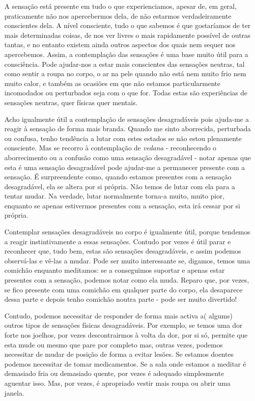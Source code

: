 A sensação está presente em tudo o que experienciamos, apesar de, em
geral, praticamente não nos apercebermos dela, de não estarmos
verdadeiramente conscientes dela. A nível consciente, tudo o que sabemos
é que gostaríamos de ter mais determinadas coisas, de nos ver livres o
mais rapidamente possível de outras tantas, e no entanto existem ainda
outros aspectos dos quais nem sequer nos apercebemos. Assim, a
contemplação das sensações é uma base muito útil para a consciência.
Pode ajudar-nos a estar mais conscientes das sensações neutras, tal como
sentir a roupa no corpo, o ar na pele quando não está nem muito frio nem
muito calor, e também as ocasiões em que não estamos particularmente
incomodados ou perturbados seja com o que for. Todas estas são
experiências de sensações neutras, quer físicas quer mentais.

Acho igualmente útil a contemplação de sensações desagradáveis pois
ajuda-me a reagir à sensação de forma mais branda. Quando me sinto
aborrecida, perturbada ou confusa, tenho tendência a lutar com estes
estados se não estou plenamente consciente. Mas se recorro à
contemplação de \emph{vedana} - reconhecendo o aborrecimento ou a
confusão como uma sensação desagradável - notar apenas que esta é uma
sensação desagradável pode ajudar-me a permanecer presente com a
sensação. É surpreendente como, quando estamos presentes com a sensação
desagradável, ela se altera por si própria. Não temos de lutar com ela
para a tentar mudar. Na verdade, lutar normalmente torna-a muito, muito
pior, enquanto se apenas estivermos presentes com a sensação, esta irá
cessar por si própria.

Contemplar sensações desagradáveis no corpo é igualmente útil, porque
tendemos a reagir instintivamente a essas sensações. Contudo por vezes é
útil parar e reconhecer que, tudo bem, estas são sensações
desagradáveis, e assim podemos observá-las e vê-las a mudar. Pode ser
muito interessante se, digamos, temos uma comichão enquanto meditamos:
se a conseguimos suportar e apenas estar presentes com a sensação,
podemos notar como ela muda. Reparo que, por vezes, se fico presente com
uma comichão em qualquer parte do corpo, ela desaparece dessa parte e
depois tenho comichão noutra parte - pode ser muito divertido!

Contudo, podemos necessitar de responder de forma mais activa a( algums)
outros tipos de sensações físicas desagradáveis. Por exemplo, se temos
uma dor forte nos joelhos, por vezes descontrairmos à volta da dor, por
si só, permite que esta mude ou mesmo que pare por completo mas, outras
vezes, podemos necessitar de mudar de posição de forma a evitar lesões.
Se estamos doentes podemos necessitar de tomar medicamentos. Se a sala
onde estamos a meditar é demasiado fria ou demasiado quente, por vezes é
adequado simplesmente aguentar isso. Mas, por vezes, é apropriado vestir
mais roupa ou abrir uma janela.

